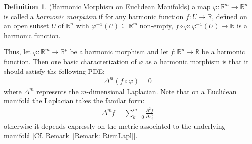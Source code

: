 \documentclass[12pt]{article}
\theoremstyle{definition}
\newtheorem{definition}{Definition}[section]
\numberwithin{equation}{subsection}
\begin{document}
\begin{definition} \label{def: EuclHM}
(Harmonic Morphism on Euclidean Manifolds) a map $\varphi: \mathbb{R}^m \rightarrow \mathbb{R}^n$ is called a \textit{harmonic morphism} if for any harmonic function $f: U \rightarrow \mathbb{R}$, defined on an open subset $U$ of $\mathbb{R}^n$ with $\varphi^{-1}(U) \subseteq \mathbb{R}^m$ non-empty, $f \circ \varphi: \varphi^{-1}(U) \rightarrow \mathbb{R}$ is a harmonic function.
\end{definition}

 Thus, let $\varphi: \mathbb{R}^m \rightarrow \mathbb{R}^p$ be a harmonic morphism and let $f: \mathbb{R}^p \rightarrow \mathbb{R}$
be a harmonic function. Then one basic characterization of $\varphi$ as a harmonic morphism is that it should satisfy the following PDE:
\begin{align}\label{eq:basicHM}
    \Delta^m (f \circ \varphi) = 0
\end{align}
where $\Delta^m$ represents the $m$-dimensional Laplacian. Note that on a Euclidean manifold the Laplacian takes the familar form:
\begin{align}
  \Delta^m f = \sum_{k=0}^{m} \frac{\partial^2f}{\partial x_i^2}  
\end{align}
otherwise it depends expressly on the metric associated to the underlying manifold [Cf. Remark~\ref{Remark: RiemLapl}].
\end{document}
